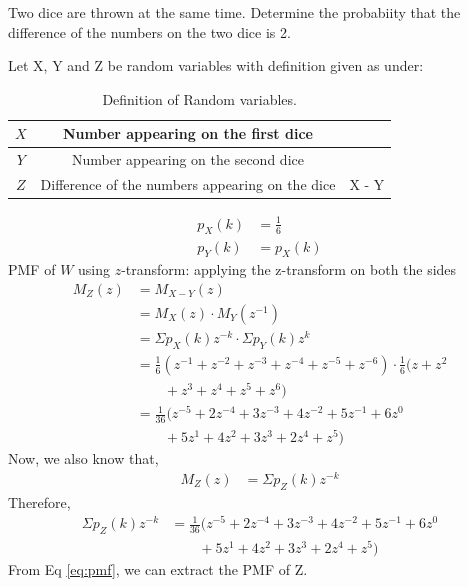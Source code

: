 \documentclass[]{article}
\begin{document}
\providecommand{\qfunc}[1]{\ensuremath{Q\left(#1\right)}}
\providecommand{\gauss}[2]{\mathcal{N}\ensuremath{\left(#1,#2\right)}}
\providecommand{\diff}[2]{\ensuremath{\frac{d{#1}}{d{#2}}}}
\providecommand{\myceil}[1]{\left \lceil #1 \right \rceil }
\newcommand\figref{Fig.~\ref}
\newcommand\tabref{Table~\ref}
\newcommand{\sinc}{\,\text{sinc}\,}
\newcommand{\rect}{\,\text{rect}\,}

\let\vec\mathbf

Two dice are thrown at the same time. Determine the probabiity that the difference
of the numbers on the two dice is 2. 

\solution
Let X, Y and Z be random variables with definition given as under:
\begin{table}[H]
\centering
\begin{tabular}{|c|c|c|}
    \hline
    $X$ & Number appearing on the first dice & \\
    \hline
    $Y$ & Number appearing on the second dice & \\
    \hline
    $Z$ & Difference of the numbers appearing on the dice & X - Y\\
    \hline
\end{tabular}
\label{tab:ncert/10/13/3/1/}
\caption{Definition of Random variables.}
\end{table}

\begin{align}
    p_X(k) &= \frac{1}{6}\\
	p_Y(k) &= p_X(k) 
\end{align}
PMF of $W$ using $z$-transform:
applying the z-transform on both the sides
\begin{align}
	M_Z(z) &= M_{X-Y}(z)\\
	&= M_X(z)\cdot M_Y(z^{-1})\\
  &= \Sigma p_X(k)z^{-k} \cdot \Sigma p_Y(k)z^{k}\\
  &= \frac{1}{6}(z^{-1}+z^{-2}\nonumber+z^{-3}+z^{-4}+z^{-5}+z^{-6}) \cdot \frac{1}{6}(z+z^2 \\&\qquad +z^3+z^4+z^5+z^6) \\
  &= \frac{1}{36}(z^{-5}+2z^{-4}+3z^{-3}+4z^{-2}+5z^{-1}+6z^{0}\nonumber\\&\qquad+5z^{1}+4z^{2}+3z^{3}+2z^{4}+z^{5})
\end{align}
Now, we also know that, 
\begin{align}
	M_Z(z) &= \Sigma p_Z(k)z^{-k}
\end{align}
Therefore, 
\begin{align}
	\Sigma p_Z(k)z^{-k} &= \frac{1}{36}(z^{-5}+2z^{-4}+3z^{-3}+4z^{-2}+5z^{-1}+6z^{0}\nonumber\\&\qquad+5z^{1}+4z^{2}+3z^{3}+2z^{4}+z^{5}) \label{eq:pmf}
\end{align}
From Eq \eqref{eq:pmf}, we can extract the PMF of Z.
\end{document}
